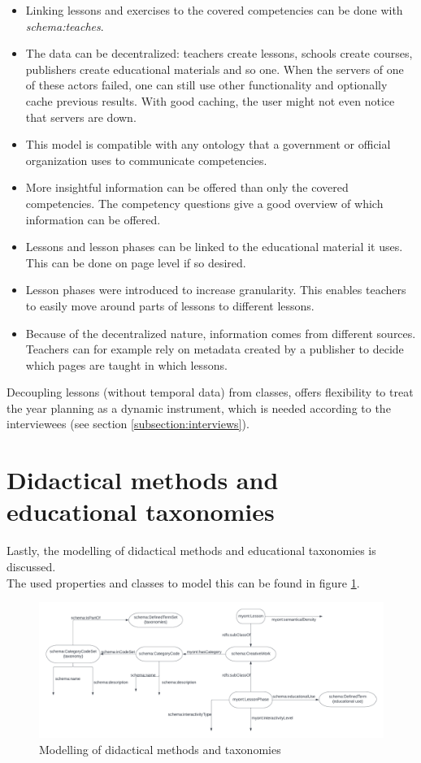 \documentclass[a4paper]{report}
\begin{document}
    \begin{itemize}
        \item Linking lessons and exercises to the covered competencies can be done with \textit{schema:teaches}.
        \item The data can be decentralized: teachers create lessons, schools create courses, publishers create educational materials and so one. When the servers of one of these actors failed, one can still use other functionality and optionally cache previous results. With good caching, the user might not even notice that servers are down.
        \item This model is compatible with any ontology that a government or official organization uses to communicate competencies.
        \item More insightful information can be offered than only the covered competencies. The competency questions give a good overview of which information can be offered.
        \item Lessons and lesson phases can be linked to the educational material it uses. This can be done on page level if so desired.
        \item Lesson phases were introduced to increase granularity. This enables teachers to easily move around parts of lessons to different lessons.
        \item Because of the decentralized nature, information comes from different sources. Teachers can for example rely on metadata created by a publisher to decide which pages are taught in which lessons.
    \end{itemize}
    Decoupling lessons (without temporal data) from classes, offers flexibility to treat the year planning as a dynamic instrument, which is needed according to the interviewees (see section \ref{subsection:interviews}).


    \section{Didactical methods and educational taxonomies}
    \label{subsection:taxonomies}
    Lastly, the modelling of didactical methods and educational taxonomies is discussed.\\
    The used properties and classes to model this can be found in figure \ref{fig:uml-dm}.

    \begin{figure}[h]
        \caption{Modelling of didactical methods and taxonomies}
        \label{fig:uml-dm}
        \includegraphics[scale=0.5]{uml-taxonomies.png}
    \end{figure}
\end{document}
